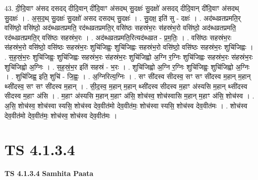 \documentclass[17pt]{extarticle}
\begin{document}
43. दी॒दि॒वाꣳ अ॑सद दसदद् दीदि॒वान् दी॑दि॒वाꣳ अ॑सदथ् सु॒दक्षः॑ सु॒दक्षो॑ असदद् दीदि॒वान् 
दी॑दि॒वाꣳ अ॑सदथ् सु॒दक्षः॑ । . अ॒स॒द॒थ् सु॒दक्षः॑ सु॒दक्षो॑ असद दसदथ् सु॒दक्षः॑ । . सु॒दक्ष॒ इति॑ सु - दक्षः॑ । . अद॑ब्धव्रतप्रमति॒र् वसि॑ष्ठो॒ वसि॑ष्ठो॒ अद॑ब्धव्रतप्रमति॒ रद॑ब्धव्रतप्रमति॒र् वसि॑ष्ठः सहस्रंभ॒रः स॑हस्रंभ॒रो वसि॑ष्ठो॒ अद॑ब्धव्रतप्रमति॒ रद॑ब्धव्रतप्रमति॒र् वसि॑ष्ठः सहस्रंभ॒रः । . अद॑ब्धव्रतप्रमति॒रित्यद॑ब्धव्रत - प्र॒म॒तिः॒ । . वसि॑ष्ठः सहस्रंभ॒रः स॑हस्रंभ॒रो वसि॑ष्ठो॒ वसि॑ष्ठः सहस्रंभ॒रः शुचि॑जिह्वः॒ शुचि॑जिह्वः सहस्रंभ॒रो वसि॑ष्ठो॒ वसि॑ष्ठः सहस्रंभ॒रः शुचि॑जिह्वः । . स॒ह॒स्रं॒भ॒रः शुचि॑जिह्वः॒ शुचि॑जिह्वः सहस्रंभ॒रः स॑हस्रंभ॒रः शुचि॑जिह्वो अ॒ग्नि र॒ग्निः शुचि॑जिह्वः सहस्रंभ॒रः स॑हस्रंभ॒रः शुचि॑जिह्वो अ॒ग्निः । . स॒ह॒स्रं॒भ॒र इति॑ सहस्रं - भ॒रः । . शुचि॑जिह्वो अ॒ग्नि र॒ग्निः शुचि॑जिह्वः॒ शुचि॑जिह्वो अ॒ग्निः । . शुचि॑जिह्व॒ इति॒ शुचि॑ - जि॒ह्वः॒ । . अ॒ग्निरित्य॒ग्निः । . सꣳ सी॑दस्व सीदस्व॒ सꣳ सꣳ सी॑दस्व म॒हान् म॒हान् थ्सी॑दस्व॒ सꣳ सꣳ सी॑दस्व म॒हान् । . सी॒द॒स्व॒ म॒हान् म॒हान् थ्सी॑दस्व सीदस्व म॒हाꣳ अ॑स्यसि म॒हान् थ्सी॑दस्व सीदस्व म॒हाꣳ अ॑सि । . म॒हाꣳ अ॑स्यसि म॒हान् म॒हाꣳ अ॑सि॒ शोच॑स्व॒ शोच॑स्वासि म॒हान् म॒हाꣳ अ॑सि॒ शोच॑स्व । . अ॒सि॒ शोच॑स्व॒ शोच॑स्वा स्यसि॒ शोच॑स्व देव॒वीत॑मो देव॒वीत॑मः॒ शोच॑स्वा स्यसि॒ शोच॑स्व देव॒वीत॑मः । . शोच॑स्व देव॒वीत॑मो देव॒वीत॑मः॒ शोच॑स्व॒ शोच॑स्व देव॒वीत॑मः । \newline
\pagebreak
{}

\section{ TS 4.1.3.4 }

\textbf{TS 4.1.3.4 } \newline
\textbf{Samhita Paata} \newline
\end{document}
